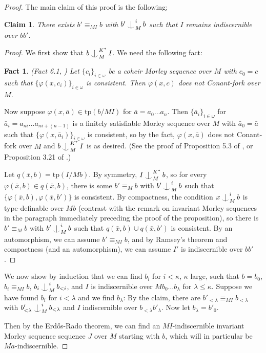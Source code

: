 \documentclass[12pt]{amsart}
\newtheorem{claim}[theorem]{Claim}
\newtheorem{fact}[theorem]{Fact}
\theoremstyle{definition}
\def\Ind#1#2{#1\setbox0=\hbox{$#1x$}\kern\wd0\hbox to 0pt{\hss$#1\mid$\hss}
\lower.9\ht0\hbox to 0pt{\hss$#1\smile$\hss}\kern\wd0}
\def\ind{\mathop{\mathpalette\Ind{}}}
\begin{document}
\begin{proof}
The main claim of this proof is the following;

\begin{claim}
There exists $b'\equiv_{MI} b$ with $b' \ind_{M}^{i} b$ such that $I$ remains indiscernible over $bb'$.
\end{claim}

\begin{proof}
    

We first show that $b \ind_{M}^{K^{*}}I$. We need the following fact:

\begin{fact} \label{4-conantforkdivide} (Fact 6.1, \cite{GFA})
Let $\{c_{i}\}_{i \in \omega}$ be a coheir Morley sequence over $M$ with $c_{0}=c$ such that $\{\varphi(x, c_{i})\}_{i \in \omega}$ is consistent. Then $\varphi(x, c)$ does not Conant-fork over $M$.

    
\end{fact}

Now suppose $\varphi(x, \bar{a}) \in \mathrm{tp}(b/MI)$ for $\bar{a}=a_{0} \ldots a_{n}$. Then $\{\bar{a}_{i}\}_{i \in \omega}$ for $\bar{a}_{i}=a_{ni}\ldots a_{ni+(n-1)}$ is a finitely satisfiable Morley sequence over $M$ with $\bar{a}_{0}=\bar{a}$ such that $\{\varphi(x, \bar{a}_{i})\}_{i \in \omega}$ is consistent, so by the fact, $\varphi(x, \bar{a})$ does not Conant-fork over $M$ and $b \ind_{M}^{K^{*}}I$ is as desired. (See the proof of Proposition 5.3 of \cite{NSOP2}, or Proposition 3.21 of \cite{KR17}.)

Let $q(\bar{x}, b) =\mathrm{tp}(I/Mb)$. By symmetry, $I \ind^{K^{*}}_{M} b$, so for every $\varphi(\bar{x}, b) \in q(\bar{x}, b)$, there is some $b' \equiv_{M} b$ with $b'\ind^{i}_{M}b$ such that $\{\varphi(\bar{x}, b), \varphi(\bar{x}, b')\}$ is consistent. By compactness, the condition $x \ind^{i}_{M} b$ is type-definable over $Mb$ (contrast with the remark on invariant Morley sequences in the paragraph immediately preceding the proof of the proposition), so there is $b' \equiv_{M} b$ with $b'\ind^{i}_{M}b$ such that $q(\bar{x}, b) \cup q(\bar{x}, b')$ is consistent. By an automorphism, we can assume $b' \equiv_{MI} b$, and by Ramsey's theorem and compactness (and an automorphism), we can assume $I'$ is indiscernible over $bb'$.

\end{proof}

We now show by induction that we can find $b_{i}$ for $i < \kappa$, $\kappa$ large, such that $b = b_{0}$, $b_{i} \equiv_{MI} b$, $b_{i} \ind^{i}_{M} b_{< i}$, and $I$ is indiscernible over $Mb_{0} \ldots b_{\lambda}$ for $\lambda \leq  \kappa $. Suppose we have found $b_{i}$ for $ i < \lambda$ and we find $b_{\lambda}$: By the claim, there are $b'_{< \lambda} \equiv_{MI} b_{<\lambda}$ with $b'_{<\lambda} \ind^{i}_{M} b_{<\lambda}$ and $I$ indiscernible over $b_{<\lambda} b'_{\lambda}$. Now let $b_{\lambda} = b'_{0}$.

Then by the Erdős-Rado theorem, we can find an $MI$-indiscernible invariant Morley sequence sequence $J$ over $M$ starting with $b$, which will in particular be $Ma$-indiscernible.




\end{proof}
\end{document}
